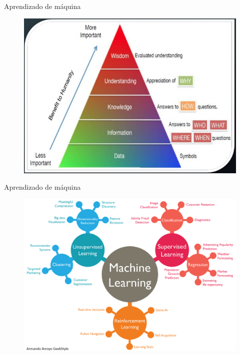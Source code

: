 \documentclass[t]{beamer}
\begin{document}
\begin{frame}{Aprendizado de máquina}
\begin{figure}
	\includegraphics[width=\linewidth]{beneficiosdaanalisedosdados}
\end{figure}
\end{frame}

\begin{frame}{Aprendizado de máquina}
\begin{figure}
	\includegraphics[width=\linewidth]{machinelearning}
\end{figure}
\end{frame}



\frame{\titlepage}
\end{document}

